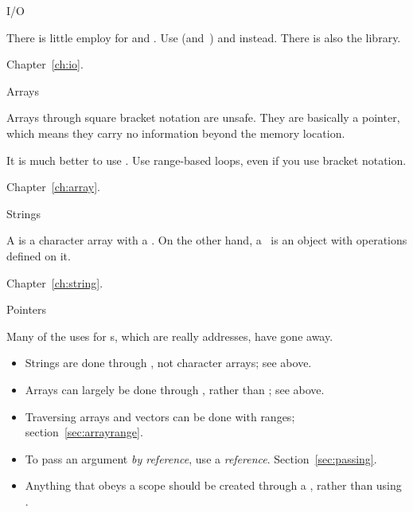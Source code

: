 
 {I/O}

There is little employ for  and
. Use  (and~)
and  instead. There is also the  library.

Chapter~\ref{ch:io}.

 {Arrays}

Arrays through square bracket notation are unsafe. They are basically
a pointer, which means they carry no information beyond the memory location.

It is much better
to use . Use range-based loops, even if you use
bracket notation.

Chapter~\ref{ch:array}.

 {Strings}

A  is a character array with a . On the other hand, a~ is an object
with operations defined on it.

Chapter~\ref{ch:string}.

 {Pointers}

Many of the uses for s, which are
really addresses, have gone away.
\begin{itemize}
\item Strings are done through , not character arrays;
  see above.
\item Arrays can largely be done through , rather than
  ; see above.
\item Traversing arrays and vectors can be done with ranges;
  section~\ref{sec:arrayrange}.
\item To pass an argument
  \emph{by reference},
  use a \emph{reference}.
  Section~\ref{sec:passing}.
\item Anything that obeys a scope should be created through a
  , rather than using .
\end{itemize}

